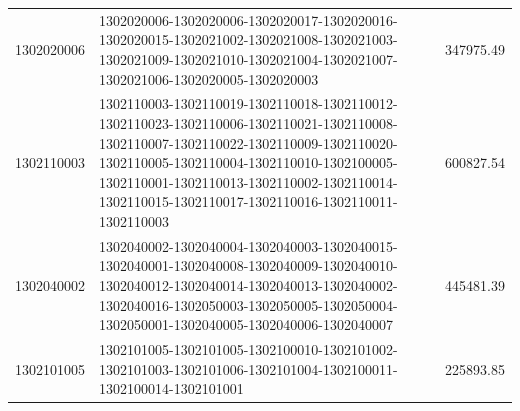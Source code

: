 \begin{longtable}[!]{lp{8cm}r}
		1302020006 & 1302020006-1302020006-1302020017-1302020016-1302020015-1302021002-1302021008-1302021003-1302021009-1302021010-1302021004-1302021007-1302021006-1302020005-1302020003 & 347975.49 \\
		1302110003 & 1302110003-1302110019-1302110018-1302110012-1302110023-1302110006-1302110021-1302110008-1302110007-1302110022-1302110009-1302110020-1302110005-1302110004-1302110010-1302100005-1302110001-1302110013-1302110002-1302110014-1302110015-1302110017-1302110016-1302110011-1302110003 & 600827.54 \\
		1302040002 & 1302040002-1302040004-1302040003-1302040015-1302040001-1302040008-1302040009-1302040010-1302040012-1302040014-1302040013-1302040002-1302040016-1302050003-1302050005-1302050004-1302050001-1302040005-1302040006-1302040007 & 445481.39 \\
		1302101005 & 1302101005-1302101005-1302100010-1302101002-1302101003-1302101006-1302101004-1302100011-1302100014-1302101001 & 225893.85 \\
\end{longtable}


